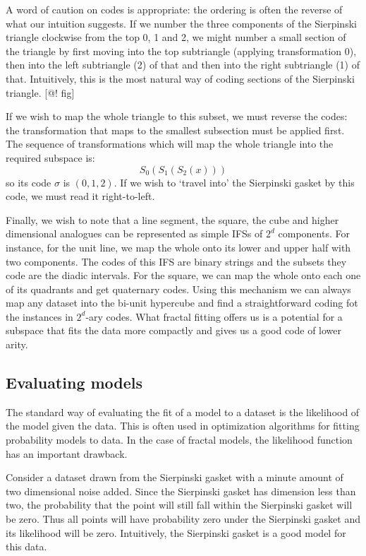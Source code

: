\documentclass[10pt]{article}
\theoremstyle{definition}
\begin{document}
A word of caution on codes is appropriate: the ordering is often the reverse of what our intuition suggests. If we number the three components of the Sierpinski triangle clockwise from the top 0, 1 and 2, we might number a small section of the triangle by first moving into the top subtriangle (applying transformation 0), then into the left subtriangle (2) of that and then into the right subtriangle (1) of that. Intuitively, this is the most natural way of coding sections of the Sierpinski triangle. [@! fig]

If we wish to map the whole triangle to this subset, we must reverse the codes: the transformation that maps to the smallest subsection must be applied first. The sequence of transformations which will map the whole triangle into the required subspace is:
\[
S_0(S_1(S_2(x)))
\]
so its code $\sigma$ is $(0, 1, 2)$. If we wish to `travel into' the Sierpinski gasket by this code, we must read it right-to-left.

Finally, we wish to note that a line segment, the square, the cube and higher dimensional analogues can be represented as simple IFSs of $2^d$ components. For instance, for the unit line, we map the whole onto its lower and upper half with two components. The codes of this IFS are binary strings and the subsets they code are the diadic intervals. For the square, we can map the whole onto each one of its quadrants and get quaternary codes. Using this mechanism we can always map any dataset into the bi-unit hypercube and find a straightforward coding fot the instances in $2^d$-ary codes. What fractal fitting offers us is a potential for a subspace that fits the data more compactly and gives us a good code of lower arity.


\subsection{Evaluating models}

The standard way of evaluating the fit of a model to a dataset is the likelihood of the model given the data. This is often used in optimization algorithms for fitting probability models to data. In the case of fractal models, the likelihood function has an important drawback. 

Consider a dataset drawn from the Sierpinski gasket with a minute amount of two dimensional noise added. Since the Sierpinski gasket has dimension less than two, the probability that the point will still fall within the Sierpinski gasket will be zero. Thus all points will have probability zero under the Sierpinski gasket and its likelihood will be zero. Intuitively, the Sierpinski gasket is a good model for this data.
\end{document}
